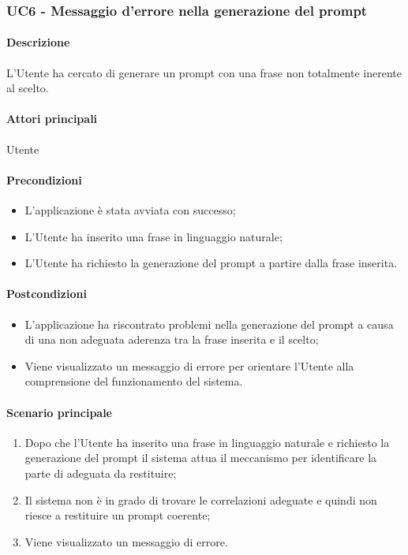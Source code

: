 \subsubsection{UC6 - Messaggio d'errore nella generazione del prompt}\label{UC6}
\paragraph*{Descrizione}
L’Utente ha cercato di generare un prompt con una frase non totalmente inerente al  scelto.

\paragraph*{Attori principali}
Utente

\paragraph*{Precondizioni}
\begin{itemize}
  \item L'applicazione è stata avviata con successo;
  \item L’Utente ha inserito una frase in linguaggio naturale;
  \item L’Utente ha richiesto la generazione del prompt a partire dalla frase inserita.  
\end{itemize}

\paragraph*{Postcondizioni}
\begin{itemize}
  \item L’applicazione ha riscontrato problemi nella generazione del prompt a causa di una non adeguata aderenza tra la frase inserita e il  scelto;
  \item Viene visualizzato un messaggio di errore per orientare l’Utente alla comprensione del funzionamento del sistema.
\end{itemize}

\paragraph*{Scenario principale}
\begin{enumerate}
  \item Dopo che l’Utente ha inserito una frase in linguaggio naturale e richiesto la generazione del prompt il sistema attua il meccanismo per identificare la parte di  adeguata da restituire;
  \item Il sistema non è in grado di trovare le correlazioni adeguate e quindi non riesce a restituire un prompt coerente;
  \item Viene visualizzato un messaggio di errore.  
\end{enumerate}

